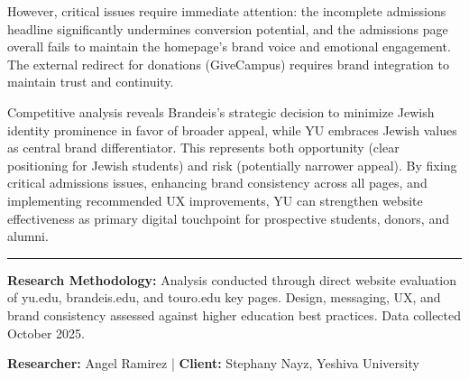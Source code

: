 \documentclass[12pt,letterpaper]{article}
\begin{document}
However, critical issues require immediate attention: the incomplete admissions headline significantly undermines conversion potential, and the admissions page overall fails to maintain the homepage's brand voice and emotional engagement. The external redirect for donations (GiveCampus) requires brand integration to maintain trust and continuity.

Competitive analysis reveals Brandeis's strategic decision to minimize Jewish identity prominence in favor of broader appeal, while YU embraces Jewish values as central brand differentiator. This represents both opportunity (clear positioning for Jewish students) and risk (potentially narrower appeal). By fixing critical admissions issues, enhancing brand consistency across all pages, and implementing recommended UX improvements, YU can strengthen website effectiveness as primary digital touchpoint for prospective students, donors, and alumni.

\vspace{0.5cm}

\noindent\rule{\textwidth}{0.4pt}

\textbf{Research Methodology:} Analysis conducted through direct website evaluation of yu.edu, brandeis.edu, and touro.edu key pages. Design, messaging, UX, and brand consistency assessed against higher education best practices. Data collected October 2025.

\textbf{Researcher:} Angel Ramirez | \textbf{Client:} Stephany Nayz, Yeshiva University
\end{document}
